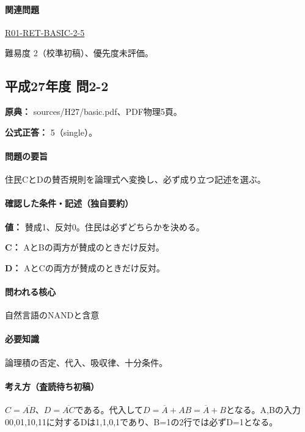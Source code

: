 \paragraph{関連問題} \hyperref[q:r01-ret-basic-2-5]{R01-RET-BASIC-2-5}

\par 難易度 2（校準初稿）、優先度未評価。

\subsection{平成27年度 問2-2}
\label{q:h27-reg-basic-2-2}

\noindent\textbf{原典：} sources/H27/basic.pdf、PDF物理5頁。

\textbf{公式正答：} 5（single）。

\paragraph{問題の要旨} 住民CとDの賛否規則を論理式へ変換し、必ず成り立つ記述を選ぶ。

\paragraph{確認した条件・記述（独自要約）}\mbox{}\par

\noindent\textbf{値：} 賛成1、反対0。住民は必ずどちらかを決める。\par

\noindent\textbf{C：} AとBの両方が賛成のときだけ反対。\par

\noindent\textbf{D：} AとCの両方が賛成のときだけ反対。\par

\paragraph{問われる核心} 自然言語のNANDと含意

\paragraph{必要知識} 論理積の否定、代入、吸収律、十分条件。

\paragraph{考え方（査読待ち初稿）} \(C=\overline{AB}\)、\(D=\overline{AC}\)である。代入して\(D=\overline A+AB=\overline A+B\)となる。A,Bの入力00,01,10,11に対するDは1,1,0,1であり、B=\allowbreak{}1の2行では必ずD=\allowbreak{}1となる。

